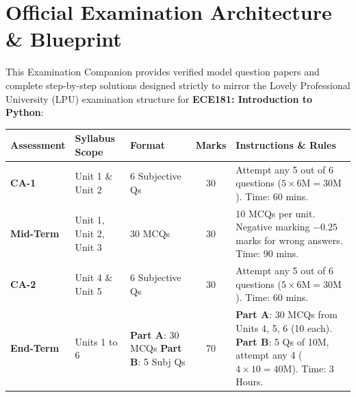 \chapter*{Official Examination Architecture \& Blueprint}

This Examination Companion provides verified model question papers and complete step-by-step solutions designed strictly to mirror the Lovely Professional University (LPU) examination structure for \textbf{ECE181: Introduction to Python}:

\begin{center}
\begin{tabularx}{\textwidth}{l p{3.2cm} p{2.8cm} c X}
\toprule
\textbf{Assessment} & \textbf{Syllabus Scope} & \textbf{Format} & \textbf{Marks} & \textbf{Instructions \& Rules} \\
\midrule
\textbf{CA-1} & Unit 1 \& Unit 2 & 6 Subjective Qs & 30 & Attempt any 5 out of 6 questions ($5 \times 6\text{M} = 30\text{M}$). Time: 60 mins. \\
\addlinespace
\textbf{Mid-Term} & Unit 1, Unit 2, Unit 3 & 30 MCQs & 30 & 10 MCQs per unit. Negative marking $-0.25$ marks for wrong answers. Time: 90 mins. \\
\addlinespace
\textbf{CA-2} & Unit 4 \& Unit 5 & 6 Subjective Qs & 30 & Attempt any 5 out of 6 questions ($5 \times 6\text{M} = 30\text{M}$). Time: 60 mins. \\
\addlinespace
\textbf{End-Term} & Units 1 to 6 & \textbf{Part A}: 30 MCQs \newline \textbf{Part B}: 5 Subj Qs & 70 & \textbf{Part A}: 30 MCQs from Units 4, 5, 6 (10 each). \newline \textbf{Part B}: 5 Qs of 10M, attempt any 4 ($4 \times 10 = 40\text{M}$). Time: 3 Hours. \\
\bottomrule
\end{tabularx}
\end{center}

\newpage
